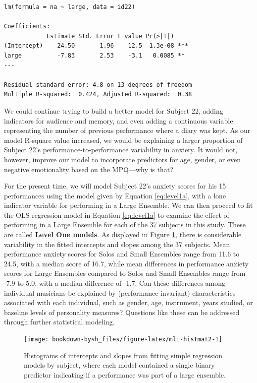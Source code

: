 \documentclass[
]{krantz}
\begin{document}
\begin{verbatim}
lm(formula = na ~ large, data = id22)

Coefficients:
            Estimate Std. Error t value Pr(>|t|)    
(Intercept)    24.50       1.96    12.5  1.3e-08 ***
large          -7.83       2.53    -3.1   0.0085 ** 
---

Residual standard error: 4.8 on 13 degrees of freedom
Multiple R-squared:  0.424, Adjusted R-squared:  0.38 
\end{verbatim}

We could continue trying to build a better model for Subject 22, adding indicators for audience and memory, and even adding a continuous variable representing the number of previous performance where a diary was kept. As our model R-square value increased, we would be explaining a larger proportion of Subject 22's performance-to-performance variability in anxiety. It would not, however, improve our model to incorporate predictors for age, gender, or even negative emotionality based on the MPQ---why is that?

For the present time, we will model Subject 22's anxiety scores for his 15 performances using the model given by Equation \eqref{eq:level1a}, with a lone indicator variable for performing in a Large Ensemble. We can then proceed to fit the OLS regression model in Equation \eqref{eq:level1a} to examine the effect of performing in a Large Ensemble for each of the 37 subjects in this study. These are called \textbf{Level One models}. As displayed in Figure \ref{fig:mli-histmat2}, there is considerable variability in the fitted intercepts and slopes among the 37 subjects. Mean performance anxiety scores for Solos and Small Ensembles range from 11.6 to 24.5, with a median score of 16.7, while mean differences in performance anxiety scores for Large Ensembles compared to Solos and Small Ensembles range from -7.9 to 5.0, with a median difference of -1.7. Can these differences among individual musicians be explained by (performance-invariant) characteristics associated with each individual, such as gender, age, instrument, years studied, or baseline levels of personality measures? Questions like these can be addressed through further statistical modeling.

\begin{figure}

{\centering \texttt{[image: bookdown-bysh\_files/figure-latex/mli-histmat2-1]} 

}

\caption{Histograms of intercepts and slopes from fitting simple regression models by subject, where each model contained a single binary predictor indicating if a performance was part of a large ensemble.}\label{fig:mli-histmat2}
\end{figure}
\end{document}
